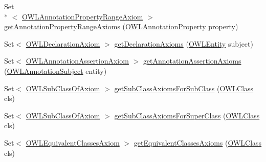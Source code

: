 \begin{DoxyCompactItemize}
\item 
Set\\*
$<$ \hyperlink{interfaceorg_1_1semanticweb_1_1owlapi_1_1model_1_1_o_w_l_annotation_property_range_axiom}{O\-W\-L\-Annotation\-Property\-Range\-Axiom} $>$ \hyperlink{interfaceorg_1_1semanticweb_1_1owlapi_1_1model_1_1_o_w_l_ontology_a7e170a70b309b910cb60708211f52e5d}{get\-Annotation\-Property\-Range\-Axioms} (\hyperlink{interfaceorg_1_1semanticweb_1_1owlapi_1_1model_1_1_o_w_l_annotation_property}{O\-W\-L\-Annotation\-Property} property)
\item 
Set$<$ \hyperlink{interfaceorg_1_1semanticweb_1_1owlapi_1_1model_1_1_o_w_l_declaration_axiom}{O\-W\-L\-Declaration\-Axiom} $>$ \hyperlink{interfaceorg_1_1semanticweb_1_1owlapi_1_1model_1_1_o_w_l_ontology_ab3a3cc8243249e8cf632dae560b299e2}{get\-Declaration\-Axioms} (\hyperlink{interfaceorg_1_1semanticweb_1_1owlapi_1_1model_1_1_o_w_l_entity}{O\-W\-L\-Entity} subject)
\item 
Set$<$ \hyperlink{interfaceorg_1_1semanticweb_1_1owlapi_1_1model_1_1_o_w_l_annotation_assertion_axiom}{O\-W\-L\-Annotation\-Assertion\-Axiom} $>$ \hyperlink{interfaceorg_1_1semanticweb_1_1owlapi_1_1model_1_1_o_w_l_ontology_a223c1e5abd3489467935d4585d4d1dcb}{get\-Annotation\-Assertion\-Axioms} (\hyperlink{interfaceorg_1_1semanticweb_1_1owlapi_1_1model_1_1_o_w_l_annotation_subject}{O\-W\-L\-Annotation\-Subject} entity)
\item 
Set$<$ \hyperlink{interfaceorg_1_1semanticweb_1_1owlapi_1_1model_1_1_o_w_l_sub_class_of_axiom}{O\-W\-L\-Sub\-Class\-Of\-Axiom} $>$ \hyperlink{interfaceorg_1_1semanticweb_1_1owlapi_1_1model_1_1_o_w_l_ontology_a69d59717261197c8311054116b70ec1e}{get\-Sub\-Class\-Axioms\-For\-Sub\-Class} (\hyperlink{interfaceorg_1_1semanticweb_1_1owlapi_1_1model_1_1_o_w_l_class}{O\-W\-L\-Class} cls)
\item 
Set$<$ \hyperlink{interfaceorg_1_1semanticweb_1_1owlapi_1_1model_1_1_o_w_l_sub_class_of_axiom}{O\-W\-L\-Sub\-Class\-Of\-Axiom} $>$ \hyperlink{interfaceorg_1_1semanticweb_1_1owlapi_1_1model_1_1_o_w_l_ontology_ac8a18c1d61f10fe71238bbc9b3141d2b}{get\-Sub\-Class\-Axioms\-For\-Super\-Class} (\hyperlink{interfaceorg_1_1semanticweb_1_1owlapi_1_1model_1_1_o_w_l_class}{O\-W\-L\-Class} cls)
\item 
Set$<$ \hyperlink{interfaceorg_1_1semanticweb_1_1owlapi_1_1model_1_1_o_w_l_equivalent_classes_axiom}{O\-W\-L\-Equivalent\-Classes\-Axiom} $>$ \hyperlink{interfaceorg_1_1semanticweb_1_1owlapi_1_1model_1_1_o_w_l_ontology_a0759265eb563bbcd5b15b516fa8c2445}{get\-Equivalent\-Classes\-Axioms} (\hyperlink{interfaceorg_1_1semanticweb_1_1owlapi_1_1model_1_1_o_w_l_class}{O\-W\-L\-Class} cls)

\end{DoxyCompactItemize}
